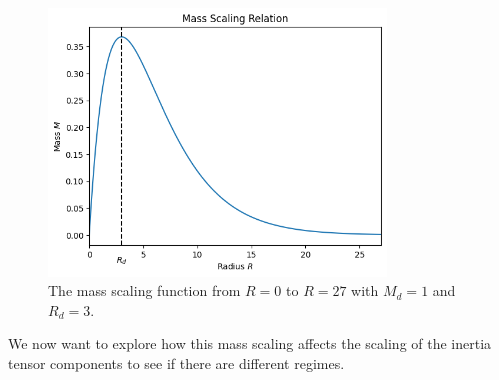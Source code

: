 \begin{figure}
    \begin{center}
        \includegraphics[width=0.8\textwidth]{resources/ring_mass_scaling.png}
        \caption{The mass scaling function from \( R = 0 \) to \( R=27 \) with \( M_d = 1 \) and \( R_d = 3 \).}\label{fig:ring_mass}
    \end{center}
\end{figure}

We now want to explore how this mass scaling affects the scaling of the inertia tensor components to see if there are different
regimes.

